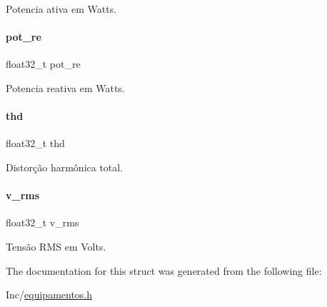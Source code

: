 Potencia ativa em Watts. \mbox{\label{struct_parametros_a4071680ad8007b59548cc410e787d0dd}} 
\paragraph{\texorpdfstring{pot\+\_\+re}{pot\_re}}
{\footnotesize\ttfamily float32\+\_\+t pot\+\_\+re}

Potencia reativa em Watts. \mbox{\label{struct_parametros_a4e36f55c7b475c21cf92002411381ed8}} 
\paragraph{\texorpdfstring{thd}{thd}}
{\footnotesize\ttfamily float32\+\_\+t thd}

Distorção harmônica total. \mbox{\label{struct_parametros_a76e107321890a99343c7331bd0a9aeff}} 
\paragraph{\texorpdfstring{v\+\_\+rms}{v\_rms}}
{\footnotesize\ttfamily float32\+\_\+t v\+\_\+rms}

Tensão R\+MS em Volts. 

The documentation for this struct was generated from the following file\+:\begin{DoxyCompactItemize}
\item 
Inc/\hyperlink{equipamentos_8h}{equipamentos.\+h}\end{DoxyCompactItemize}

